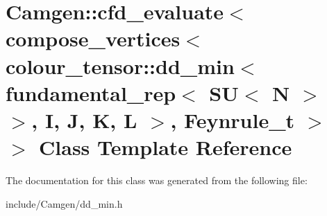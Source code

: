 \hypertarget{a00054}{}\section{Camgen\+:\+:cfd\+\_\+evaluate$<$ compose\+\_\+vertices$<$ colour\+\_\+tensor\+:\+:dd\+\_\+min$<$ fundamental\+\_\+rep$<$ S\+U$<$ N $>$ $>$, I, J, K, L $>$, Feynrule\+\_\+t $>$ $>$ Class Template Reference}
\label{a00054}


The documentation for this class was generated from the following file\+:\begin{DoxyCompactItemize}
\item 
include/\+Camgen/dd\+\_\+min.\+h\end{DoxyCompactItemize}
